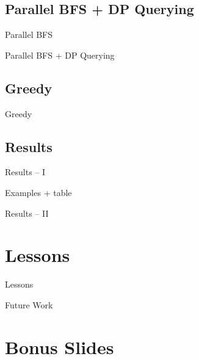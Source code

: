 \documentclass[t,10pt,
mathserif,xcolor=dvipsnames]{beamer}
\begin{document}
\subsection{Parallel BFS + DP Querying}

\begin{myframe}{Parallel BFS}

\end{myframe}

\begin{myframe}{Parallel BFS + DP Querying}

\end{myframe}

\subsection{Greedy}

\begin{myframe}{Greedy}

\end{myframe}

\subsection{Results}

\begin{myframe}{Results -- I}

  Examples + table
  
\end{myframe}

\begin{myframe}{Results -- II}

\end{myframe}

\section{Lessons}


\begin{myframe}{Lessons}
 
\end{myframe}

\begin{myframe}{Future Work}

\end{myframe}


\section{Bonus Slides}
 
\end{document}
